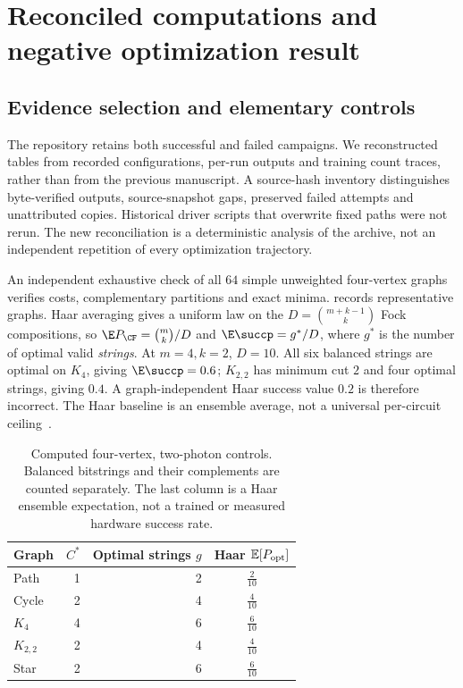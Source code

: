 \section{Reconciled computations and negative optimization result}\label{sec:experiments}
\subsection{Evidence selection and elementary controls}
The repository retains both successful and failed campaigns. We reconstructed tables from recorded configurations, per-run outputs and training count traces, rather than from the previous manuscript. A source-hash inventory distinguishes byte-verified outputs, source-snapshot gaps, preserved failed attempts and unattributed copies. Historical driver scripts that overwrite fixed paths were not rerun. The new reconciliation is a deterministic analysis of the archive, not an independent repetition of every optimization trajectory.

An independent exhaustive check of all $64$ simple unweighted four-vertex graphs verifies costs, complementary partitions and exact minima.  records representative graphs. Haar averaging gives a uniform law on the $D=\binom{m+k-1}{k}$ Fock compositions, so $\E P_{\CF}=\binom{m}{k}/D$ and $\E\succp=g^*/D$, where $g^*$ is the number of optimal valid \emph{strings}. At $m=4,k=2$, $D=10$. All six balanced strings are optimal on $K_4$, giving $\E\succp=0.6$; $K_{2,2}$ has minimum cut $2$ and four optimal strings, giving $0.4$. A graph-independent Haar success value $0.2$ is therefore incorrect. The Haar baseline is an ensemble average, not a universal per-circuit ceiling~\cite{arkhipov2012}.
\begin{table}[t]
\centering
\begin{tabular}{lrrc}
\hline
Graph & $C^*$ & Optimal strings $g$ & Haar $\mathbb{E}[P_{\rm opt}]$ \\
\hline
Path & 1 & 2 & $\frac{2}{10}$ \\
Cycle & 2 & 4 & $\frac{4}{10}$ \\
$K_4$ & 4 & 6 & $\frac{6}{10}$ \\
$K_{2,2}$ & 2 & 4 & $\frac{4}{10}$ \\
Star & 2 & 6 & $\frac{6}{10}$ \\
\hline
\end{tabular}
\caption{Computed four-vertex, two-photon controls. Balanced bitstrings and their complements are counted separately. The last column is a Haar ensemble expectation, not a trained or measured hardware success rate.}
\label{tab:graphs}
\end{table}


